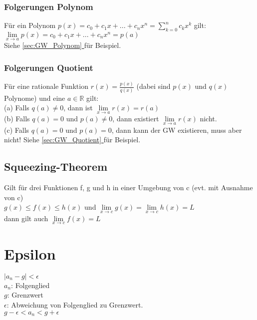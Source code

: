 \documentclass[../main.tex]{subfiles}
\begin{document}
\subsubsection{Folgerungen Polynom}
Für ein Polynom $p(x) = c_0 + c_1x + ... + c_nx^n = \sum\limits_{k=0}^n c_kx^k$ gilt: \\[7pt]
$\lim\limits_{x\to a} p(x) = c_0 + c_1x + ... + c_nx^n = p(a)$ \\ [7pt]
Siehe \hyperref[sec:GW_Polynom]{\ref{sec:GW_Polynom} } für Beispiel.

\subsubsection{Folgerungen Quotient}
Für eine rationale Funktion $r(x) = \frac{p(x)}{q(x)}$ (dabei sind $p(x)$ und $q(x)$ Polynome) und eine $a \in \mathbb{R}$ gilt: \\
(a) Falls $q(a) \neq 0$, dann ist $\lim\limits_{x\to a} r(x) = r(a)$ \\
(b) Falls $q(a) = 0$ und $p(a) \neq 0$, dann existiert $\lim\limits_{x\to a} r(x)$ nicht. \\
(c) Falls $q(a) = 0$ und $p(a) = 0$, dann kann der GW existieren, muss aber nicht!
Siehe \hyperref[sec:GW_Quotient]{\ref{sec:GW_Quotient} } für Beispiel.

\subsection{Squeezing-Theorem}
Gilt für drei Funktionen f, g und h in einer Umgebung von c (evt. mit Ausnahme von c) \\ [7pt]
$g(x) \le f(x) \le h(x)$ und $\lim\limits_{x\to c} g(x) = \lim\limits_{x\to c} h(x) = L$ \\ [7pt]
dann gilt auch $\lim\limits_{x\to c} f(x) = L$

\section{Epsilon}
$|a_n-g|<\epsilon$ \\
$a_n$: Folgenglied \\
$g$: Grenzwert \\
$\epsilon$: Abweichung von Folgenglied zu Grenzwert. \\ [7pt]
$g-\epsilon<a_n<g+\epsilon$
\end{document}
